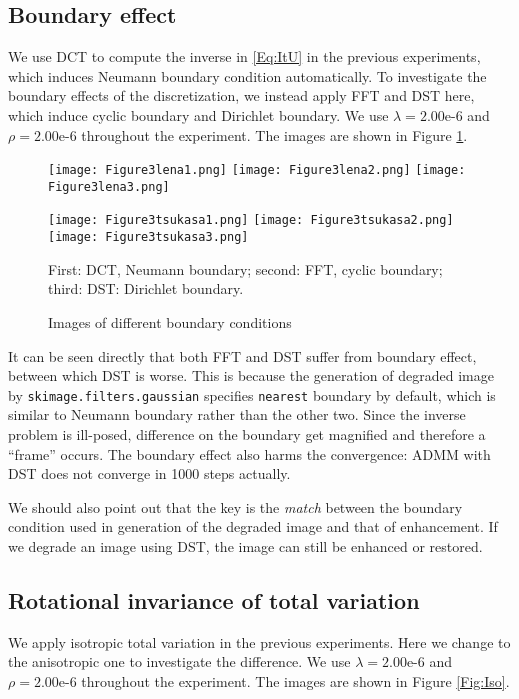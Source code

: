 \documentclass[english, nochinese]{pnote}
\begin{document}
\subsection{Boundary effect}

We use DCT to compute the inverse in \eqref{Eq:ItU} in the previous experiments, which induces Neumann boundary condition automatically. To investigate the boundary effects of the discretization, we instead apply FFT and DST here, which induce cyclic boundary and Dirichlet boundary. We use $ \lambda = \text{2.00e-6} $ and $ \rho = \text{2.00e-6} $ throughout the experiment. The images are shown in Figure \ref{Fig:Bound}.

\begin{figure}[htbp]
{
\centering

\texttt{[image: Figure3lena1.png]}
\texttt{[image: Figure3lena2.png]}
\texttt{[image: Figure3lena3.png]}

\texttt{[image: Figure3tsukasa1.png]}
\texttt{[image: Figure3tsukasa2.png]}
\texttt{[image: Figure3tsukasa3.png]}

\caption{Images of different boundary conditions}
\label{Fig:Bound}
}
{
\footnotesize First: DCT, Neumann boundary; second: FFT, cyclic boundary; third: DST: Dirichlet boundary.
}
\end{figure}

It can be seen directly that both FFT and DST suffer from boundary effect, between which DST is worse. This is because the generation of degraded image by \verb"skimage.filters.gaussian" specifies \verb"nearest" boundary by default, which is similar to Neumann boundary rather than the other two. Since the inverse problem is ill-posed, difference on the boundary get magnified and therefore a ``frame'' occurs. The boundary effect also harms the convergence: ADMM with DST does not converge in 1000 steps actually.

We should also point out that the key is the \emph{match} between the boundary condition used in generation of the degraded image and that of enhancement. If we degrade an image using DST, the image can still be enhanced or restored.

\subsection{Rotational invariance of total variation}

We apply isotropic total variation in the previous experiments. Here we change to the anisotropic one to investigate the difference. We use $ \lambda = \text{2.00e-6} $ and $ \rho = \text{2.00e-6} $ throughout the experiment. The images are shown in Figure \ref{Fig:Iso}.
\end{document}
